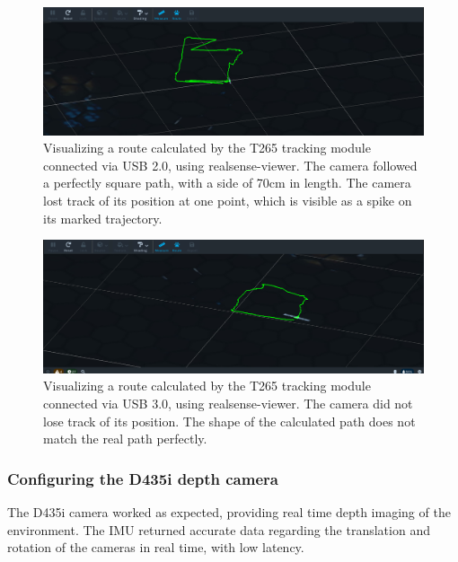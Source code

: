 \documentclass{article}
\begin{document}
\begin{figure}[h] %
	\centering
	\includegraphics[width=1\columnwidth]{report1-img027.png} %
	\caption{Visualizing a route calculated by the T265 tracking module connected via USB 2.0, using realsense-viewer. The camera followed a perfectly square path, with a side of 70cm in length. The camera lost track of its position at one point, which is visible as a spike on its marked trajectory. }
\end{figure}

\begin{figure}[h] %
	\centering
	\includegraphics[width=1\columnwidth]{report1-img028.png} %
	\caption{Visualizing a route calculated by the T265 tracking module connected via USB 3.0, using realsense-viewer. The camera did not lose track of its position. The shape of the calculated path does not match the real path perfectly. }
\end{figure}

\clearpage


\subsubsection{Configuring the D435i depth camera}

The D435i camera worked as expected, providing real time depth imaging of the environment. The IMU returned accurate data regarding the translation and rotation of the cameras in real time, with low latency.
\end{document}
